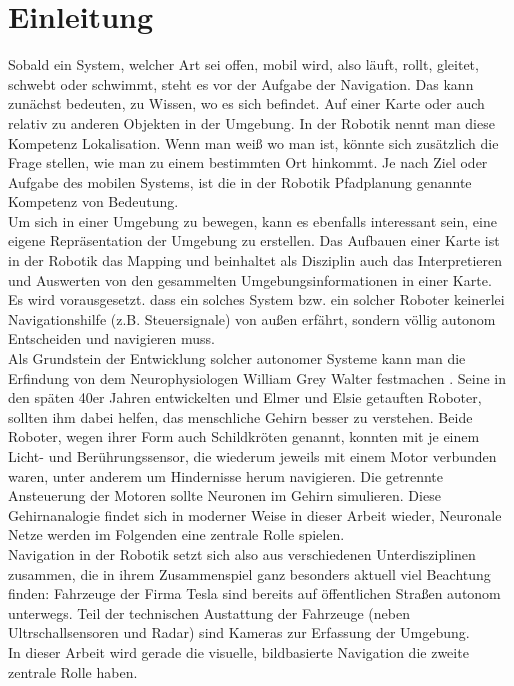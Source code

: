 %


\chapter{Einleitung}



Sobald ein System, welcher Art sei offen, mobil wird, also läuft, rollt, gleitet, schwebt oder schwimmt, steht es vor der Aufgabe der Navigation. Das kann zunächst bedeuten, zu Wissen, wo es sich befindet. Auf einer Karte oder auch relativ zu anderen Objekten in der Umgebung. In der Robotik nennt man diese Kompetenz Lokalisation. Wenn man weiß wo man ist, könnte sich zusätzlich die Frage stellen, wie man zu einem bestimmten Ort hinkommt. Je nach Ziel oder Aufgabe des mobilen Systems, ist die in der Robotik Pfadplanung genannte Kompetenz von Bedeutung.\\ Um sich in einer Umgebung zu bewegen, kann es ebenfalls interessant sein, eine eigene Repräsentation der Umgebung zu erstellen. Das Aufbauen einer Karte ist in der Robotik das Mapping und beinhaltet als Disziplin auch das Interpretieren und Auswerten von den gesammelten Umgebungsinformationen in einer Karte.\\
Es wird vorausgesetzt. dass ein solches System bzw. ein solcher Roboter keinerlei Navigationshilfe (z.B. Steuersignale) von außen erfährt, sondern völlig autonom Entscheiden und navigieren muss.\\
Als Grundstein der Entwicklung solcher autonomer Systeme kann man die Erfindung von dem Neurophysiologen William Grey Walter festmachen \cite{walter1950imitation}. Seine in den späten 40er Jahren entwickelten und \glqq Elmer \grqq{} und \glqq Elsie\grqq{} getauften Roboter, sollten ihm dabei helfen, das menschliche Gehirn besser zu verstehen. Beide Roboter, wegen ihrer Form auch Schildkröten genannt, konnten mit je einem Licht- und Berührungssensor, die wiederum jeweils mit einem Motor verbunden waren, unter anderem um Hindernisse herum navigieren. Die getrennte Ansteuerung der Motoren sollte Neuronen im Gehirn simulieren. Diese Gehirnanalogie findet sich in moderner Weise in dieser Arbeit wieder, Neuronale Netze werden im Folgenden eine zentrale Rolle spielen.\\
Navigation in der Robotik setzt sich also aus verschiedenen Unterdisziplinen zusammen, die in ihrem Zusammenspiel ganz besonders aktuell viel Beachtung finden: Fahrzeuge der Firma Tesla sind bereits auf öffentlichen Straßen autonom unterwegs. Teil der technischen Austattung der Fahrzeuge (neben Ultrschallsensoren und Radar) sind Kameras zur Erfassung der Umgebung. \\
In dieser Arbeit wird gerade die visuelle, bildbasierte Navigation die zweite zentrale Rolle haben.


